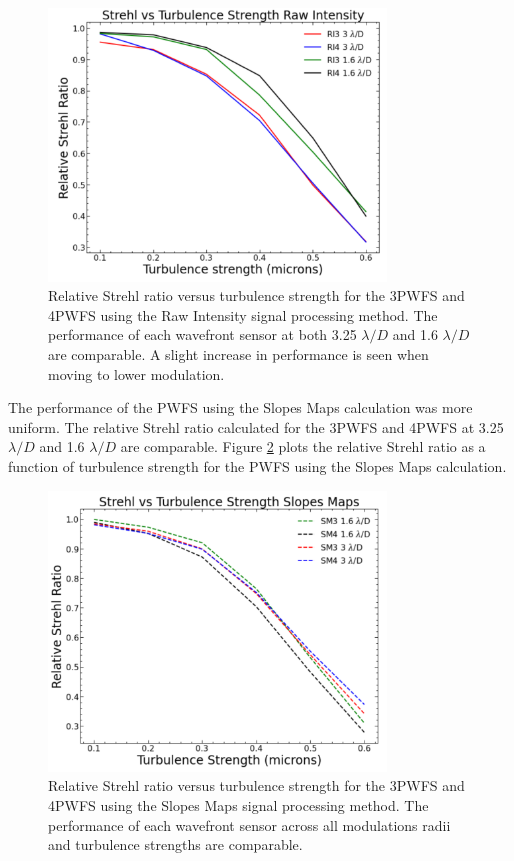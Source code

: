 \begin{figure}
    \centering
    \includegraphics[width=0.8\textwidth]{Chapter Materials/Chapter Five Materials/RawIntensityStrehlVSTurb.png}
    \caption{Relative Strehl ratio versus turbulence strength for the 3PWFS and 4PWFS using the Raw Intensity signal processing method. The performance of each wavefront sensor at both 3.25 $\lambda/D$ and 1.6 $\lambda/D$ are comparable. A slight increase in performance is seen when moving to lower modulation. }
    \label{fig:RI}
\end{figure}

The performance of the PWFS using the Slopes Maps calculation was more uniform. The relative Strehl ratio calculated for the 3PWFS and 4PWFS at 3.25 $\lambda/D$ and 1.6 $\lambda/D$ are comparable. Figure \ref{fig:SM} plots the relative Strehl ratio as a function of turbulence strength for the PWFS using the Slopes Maps calculation.

\begin{figure}
    \centering
    \includegraphics[width=0.8\textwidth]{Chapter Materials/Chapter Five Materials/SlopesMapsStrehlVsTurb.png}
    \caption{Relative Strehl ratio versus turbulence strength for the 3PWFS and 4PWFS using the Slopes Maps signal processing method. The performance of each wavefront sensor across all modulations radii and turbulence strengths are comparable.}
    \label{fig:SM}
\end{figure}

